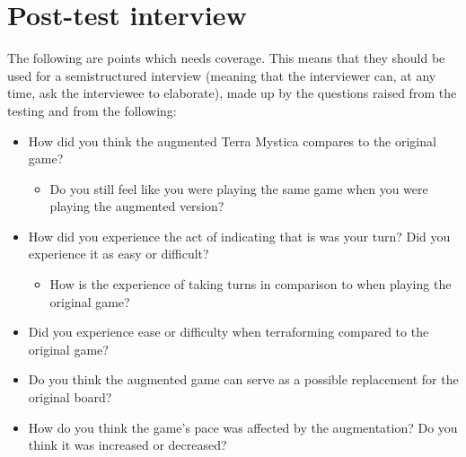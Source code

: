 \section{Post-test interview}
The following are points which needs coverage. This means that they should be used for a semistructured interview (meaning that the interviewer can, at any time, ask the interviewee to elaborate), made up by the questions raised from the testing and from the following: 
\begin{itemize}
\item How did you think the augmented Terra Mystica compares to the original game?
\begin{itemize}
\item Do you still feel like you were playing the same game when you were playing the augmented version?
\end{itemize}
\item How did you experience the act of indicating that is was your turn? Did you experience it as easy or difficult?
\begin{itemize}
\item How is the experience of taking turns in comparison to when playing the original game?
\end{itemize}
\item Did you experience ease or difficulty when terraforming compared to the original game?
\item Do you think the augmented game can serve as a possible replacement for the original board?
\item How do you think the game's pace was affected by the augmentation? Do you think it was increased or decreased?
\end{itemize}


